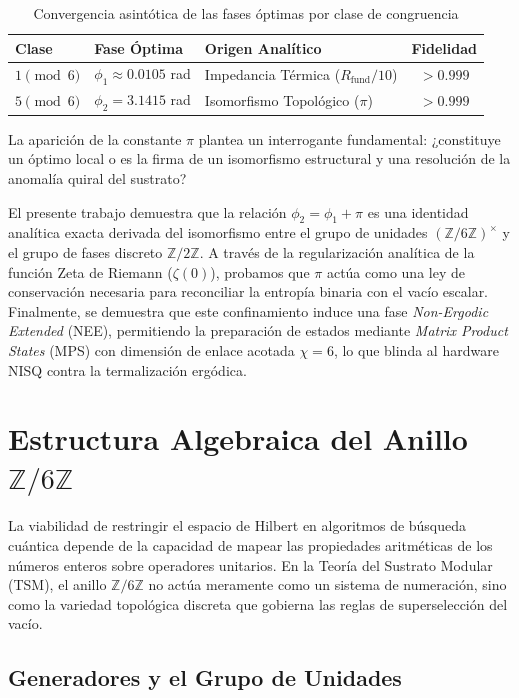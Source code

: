 \documentclass[12pt,a4paper]{article}
\theoremstyle{plain}
\theoremstyle{definition}
\theoremstyle{remark}
\begin{document}
\begin{table}[H]
\centering
\caption{Convergencia asintótica de las fases óptimas por clase de congruencia}
\label{tab:fases}
\begin{tabular}{lllc}
\toprule
\textbf{Clase} & \textbf{Fase Óptima} & \textbf{Origen Analítico} & \textbf{Fidelidad} \\
\midrule
$1 \pmod 6$ & $\phi_1 \approx 0.0105$ rad & Impedancia Térmica ($R_{\text{fund}}/10$) & $> 0.999$ \\
$5 \pmod 6$ & $\phi_2 = 3.1415$ rad & Isomorfismo Topológico ($\pi$) & $> 0.999$ \\
\bottomrule
\end{tabular}
\end{table}

La aparición de la constante $\pi$ plantea un interrogante fundamental: ¿constituye un óptimo local o es la firma de un isomorfismo estructural y una resolución de la anomalía quiral del sustrato? 

El presente trabajo demuestra que la relación $\phi_2 = \phi_1 + \pi$ es una identidad analítica exacta derivada del isomorfismo entre el grupo de unidades $(\mathbb{Z}/6\mathbb{Z})^{\times}$ y el grupo de fases discreto $\mathbb{Z}/2\mathbb{Z}$. A través de la regularización analítica de la función Zeta de Riemann ($\zeta(0)$), probamos que $\pi$ actúa como una ley de conservación necesaria para reconciliar la entropía binaria con el vacío escalar. Finalmente, se demuestra que este confinamiento induce una fase \textit{Non-Ergodic Extended} (NEE), permitiendo la preparación de estados mediante \textit{Matrix Product States} (MPS) con dimensión de enlace acotada $\chi = 6$, lo que blinda al hardware NISQ contra la termalización ergódica.

\section{Estructura Algebraica del Anillo $\mathbb{Z}/6\mathbb{Z}$}

La viabilidad de restringir el espacio de Hilbert en algoritmos de búsqueda cuántica depende de la capacidad de mapear las propiedades aritméticas de los números enteros sobre operadores unitarios. En la Teoría del Sustrato Modular (TSM), el anillo $\mathbb{Z}/6\mathbb{Z}$ no actúa meramente como un sistema de numeración, sino como la variedad topológica discreta que gobierna las reglas de superselección del vacío.

\subsection{Generadores y el Grupo de Unidades}
\end{document}
